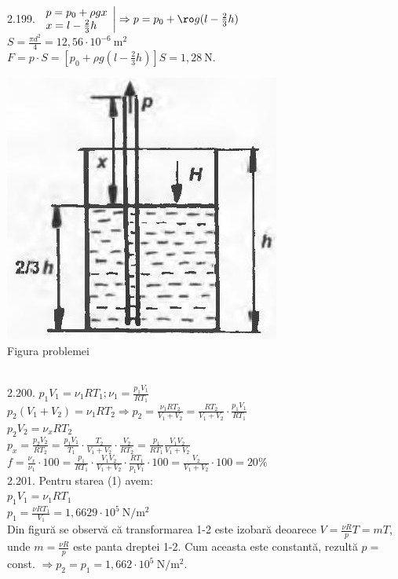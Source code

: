 2.199. $\left.\begin{array}{l} p=p_{0}+\rho g x \\  x=l-\frac{2}{3} h\end{array} \right| \Rightarrow p=p_{0} + \ro g (l - \frac{2}{3} h)$\\ $S=\frac{\pi d^{2}}{4}=12,56 \cdot 10^{-6} \mathrm{~m}^{2}$ \\ $F=p \cdot S=\left[p_{0}+\rho g\left(l-\frac{2}{3} h\right)\right] S=1,28 \mathrm{~N}$.\\ \begin{center} \includegraphics[width=0.4\linewidth]{images/2025_07_01_5b3ff9fa0d508c8e9f17g-313}\\ Figura problemei \end{center}\\

2.200. $p_{1} V_{1}=\nu_{1} R T_{1} ; \nu_{1}=\frac{p_{1} V_{1}}{R T_{1}}$\\ $p_{2}\left(V_{1}+V_{2}\right)=\nu_{1} R T_{2} \Rightarrow p_{2}=\frac{\nu_{1} R T_{2}}{V_{1}+V_{2}}=\frac{R T_{2}}{V_{1}+V_{2}} \cdot \frac{p_{1} V_{1}}{R T_{1}}$\\ $p_{2} V_{2}=\nu_{x} R T_{2}$\\ $p_{x}=\frac{p_{2} V_{2}}{R T_{2}}=\frac{p_{1} V_{1}}{T_{1}} \cdot \frac{T_{2}}{V_{1}+V_{2}} \cdot \frac{V_{2}}{R T_{2}}=\frac{p_{1}}{R T_{1}} \frac{V_{1} V_{2}}{V_{1}+V_{2}}$\\ $f=\frac{\nu_{x}}{\nu_{1}} \cdot 100=\frac{p_{1}}{R T_{1}} \cdot \frac{V_{1} V_{2}}{V_{1}+V_{2}} \cdot \frac{R T_{1}}{p_{1} V_{1}} \cdot 100=\frac{V_{2}}{V_{1}+V_{2}} \cdot 100=20 \%$\\

2.201. Pentru starea (1) avem:\\ $p_{1} V_{1}=\nu_{1} R T_{1}$\\ $p_{1}=\frac{\nu R T_{1}}{V_{1}}=1,6629 \cdot 10^{5} \mathrm{~N} / \mathrm{m}^{2}$\\ Din figură se observă că transformarea 1-2 este izobară deoarece $V=\frac{\nu R}{p} T=m T$, unde $m=\frac{\nu R}{p}$ este panta dreptei 1-2. Cum aceasta este constantă, rezultă $p=$ const. $\Rightarrow p_{2}=p_{1}=1,662 \cdot 10^{5} \mathrm{~N} / \mathrm{m}^{2}$.\\

